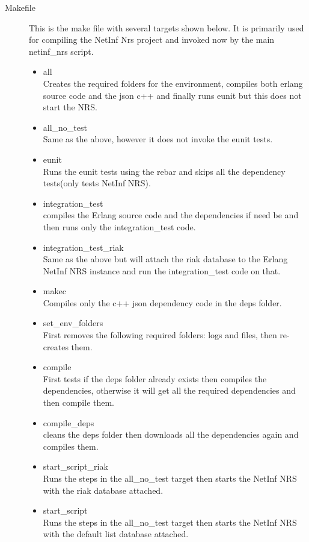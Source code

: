 \begin{description}
\item[Makefile]
This is the make file with several targets shown below. It is primarily used for compiling the NetInf Nrs project and invoked now by the main netinf\_nrs script. 
\begin{itemize}
\item all \\
Creates the required folders for the environment, compiles both erlang source code and the json c++ and finally runs eunit but this does not start the NRS.
\item all\_no\_test \\
Same as the above, however it does not invoke the eunit tests.
\item eunit \\
Runs the eunit tests using the rebar and skips all the dependency tests(only tests NetInf NRS).
\item integration\_test \\
compiles the Erlang source code and the dependencies if need be and then runs only the integration\_test code.
\item integration\_test\_riak \\
Same as the above but will attach the riak database to the Erlang NetInf NRS instance and run the integration\_test code on that.
\item makec \\
Compiles only the c++ json dependency code in the deps folder. 
\item set\_env\_folders \\
First removes the following  required folders: logs and files, then re-creates them.
\item compile \\
First tests if the deps folder already exists then compiles the dependencies, otherwise it will get all the required dependencies and then compile them.
\item compile\_deps \\
cleans the deps folder then downloads all the dependencies again and compiles them.
\item start\_script\_riak \\
Runs the steps in the all\_no\_test target then starts the NetInf NRS with the riak database attached.
\item start\_script \\
Runs the steps in the all\_no\_test target then starts the NetInf NRS with the default list database attached.

\end{itemize}
\end{description}
